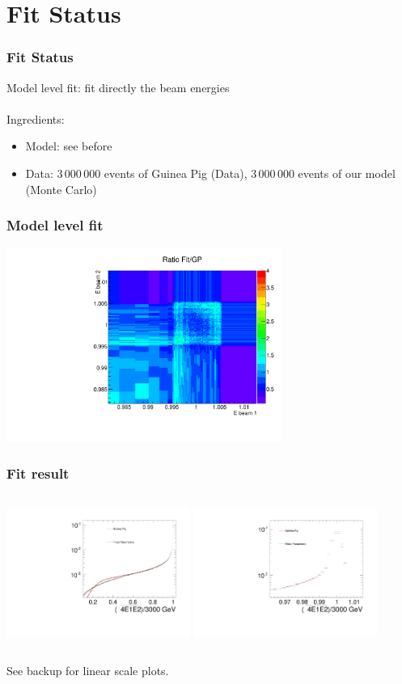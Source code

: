 \documentclass{beamer}
\begin{document}
\section{Fit Status}
\begin{frame}
\frametitle{Fit Status}
Model level fit: fit directly the beam energies\\
~\\
Ingredients:
\begin{itemize}
  \item Model: see before
  \item Data: 3\,000\,000 events of Guinea Pig (Data), 3\,000\,000 events of our
  model (Monte Carlo)
\end{itemize}
\end{frame}
\begin{frame}
\frametitle{Model level fit}
\begin{center}
\includegraphics[width=9cm]{Ratio_Fit_vs_GP_FCAL.pdf}
\end{center}
\end{frame}
\begin{frame}
\frametitle{Fit result}
\begin{columns}[c]
\column{6cm}
\includegraphics[width=6cm]{FullSpectrumFCAL.pdf}
\column{6cm}	
\includegraphics[width=6cm]{FullSpectrumFCAL_zoom.pdf}
\end{columns}
See backup for linear scale plots.
\end{frame}
\end{document}

